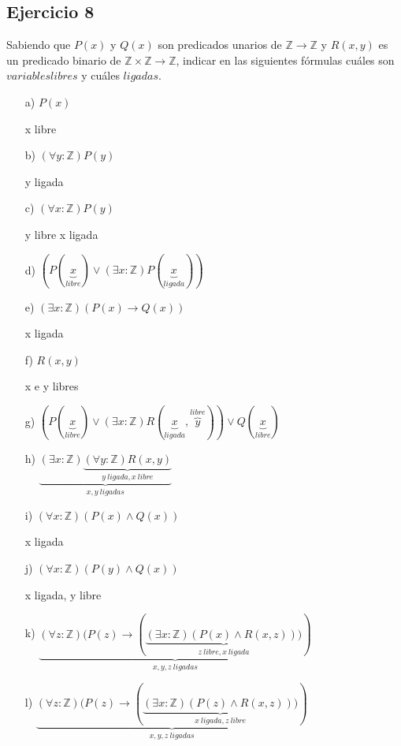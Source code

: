 \documentclass[10pt,a4paper]{article}
\begin{document}
\subsection*{Ejercicio 8}
Sabiendo que $P (x)$ y $Q(x)$ son predicados unarios de $\mathbb Z \rightarrow \mathbb Z$ y $R(x, y)$ es un predicado binario de $\mathbb Z \times \mathbb Z \rightarrow \mathbb Z$, indicar en las siguientes fórmulas cuáles son $variables libres$ y cuáles $ligadas$.
\begin{enumerate}
\item[a)]$P (x)$ 

x libre
\item[b)]$(\forall y : \mathbb{Z})P (y)$ 

y ligada

\item[c)]$(\forall x : \mathbb{Z})P (y)$

y libre x ligada

\item[d)]$(P (\underbrace{x}_{libre}) \vee (\exists x : \mathbb{Z})P (\underbrace{x}_{ligada}))$

\item[e)]$(\exists x : \mathbb{Z})(P (x) \rightarrow Q(x))$

x ligada

\item[f)]$R(x, y)$

x e y libres

\item[g)]$(P (\underbrace{x}_{libre}) \vee (\exists x : \mathbb{Z})R(\underbrace{x}_{ligada}, \overbrace{y}^{libre})) \vee Q(\underbrace{x}_{libre})$

\item[h)]$\underbrace{(\exists x : \mathbb{Z})\underbrace{(\forall y : \mathbb{Z})R(x, y)}_{y\ ligada, x\ libre}}_{x,y\ ligadas}$

\item[i)]$(\forall x : \mathbb{Z})(P (x) \wedge Q(x))$

x ligada

\item[j)]$(\forall x : \mathbb{Z})(P (y) \wedge Q(x))$

x ligada, y libre

\item[k)]$\underbrace{(\forall z : \mathbb{Z})(P (z) \rightarrow (\underbrace{(\exists x : \mathbb{Z})(P (x) \wedge R(x, z)))}_{z\ libre,x\ ligada})}_{x,y,z\ ligadas}$

\item[l)]$\underbrace{(\forall z : \mathbb{Z})(P (z) \rightarrow (\underbrace{ (\exists x : \mathbb{Z})(P (z) \wedge R(x, z)))}_{x\ ligada,z\ libre})}_{x,y,z\ ligadas}$
\end{enumerate}
\end{document}
